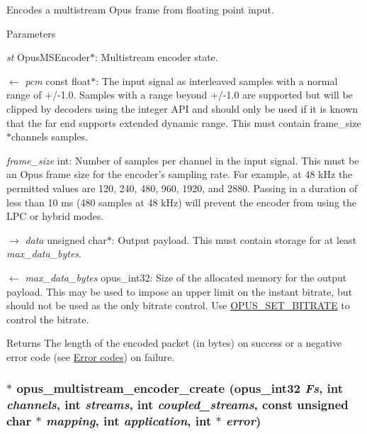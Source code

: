 Encodes a multistream Opus frame from floating point input. 
\begin{DoxyParams}{Parameters}
\item[{\em st}]{\ttfamily OpusMSEncoder$\ast$}: Multistream encoder state. \item[\mbox{$\leftarrow$} {\em pcm}]{\ttfamily const float$\ast$}: The input signal as interleaved samples with a normal range of +/-\/1.0. Samples with a range beyond +/-\/1.0 are supported but will be clipped by decoders using the integer API and should only be used if it is known that the far end supports extended dynamic range. This must contain {\ttfamily frame\_\-size$\ast$channels} samples. \item[{\em frame\_\-size}]{\ttfamily int}: Number of samples per channel in the input signal. This must be an Opus frame size for the encoder's sampling rate. For example, at 48 kHz the permitted values are 120, 240, 480, 960, 1920, and 2880. Passing in a duration of less than 10 ms (480 samples at 48 kHz) will prevent the encoder from using the LPC or hybrid modes. \item[\mbox{$\rightarrow$} {\em data}]{\ttfamily unsigned char$\ast$}: Output payload. This must contain storage for at least {\itshape max\_\-data\_\-bytes\/}. \item[\mbox{$\leftarrow$} {\em max\_\-data\_\-bytes}]{\ttfamily opus\_\-int32}: Size of the allocated memory for the output payload. This may be used to impose an upper limit on the instant bitrate, but should not be used as the only bitrate control. Use \hyperlink{group__opus__encoderctls_ga0bb51947e355b33d0cb358463b5101a7}{OPUS\_\-SET\_\-BITRATE} to control the bitrate. \end{DoxyParams}
\begin{DoxyReturn}{Returns}
The length of the encoded packet (in bytes) on success or a negative error code (see \hyperlink{group__opus__errorcodes}{Error codes}) on failure. 
\end{DoxyReturn}
\hypertarget{group__opus__multistream_gaeb64c648ed8155f824ca8d9a93ccecae}{
\subsubsection[{opus\_\-multistream\_\-encoder\_\-create}]{$\ast$ opus\_\-multistream\_\-encoder\_\-create ({\bf opus\_\-int32} {\em Fs}, \/  int {\em channels}, \/  int {\em streams}, \/  int {\em coupled\_\-streams}, \/  const unsigned char $\ast$ {\em mapping}, \/  int {\em application}, \/  int $\ast$ {\em error})}}
\label{group__opus__multistream_gaeb64c648ed8155f824ca8d9a93ccecae}


